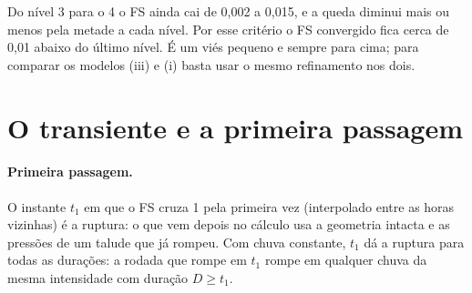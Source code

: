 \documentclass[11pt,a4paper]{article}
\begin{document}
Do nível 3 para o 4 o FS ainda cai de 0,002 a 0,015, e a queda diminui mais ou menos pela metade a cada nível. Por esse
critério o FS convergido fica cerca de 0,01 abaixo do último nível. É um viés pequeno e sempre para cima; para comparar
os modelos (iii) e (i) basta usar o mesmo refinamento nos dois.

\section{O transiente e a primeira passagem}\label{sec:trans}
\begin{table}[H]\centering\small
\caption{O transiente: o FS em 0, 24 e 48~h; a fração da chuva até 24~h que infiltrou (a chuva por metro inclinado,
74,1~m de superfície); a hora em que a superfície começa a alagar (face de percolação); o nível d'água em 24~h na
crista ($x = 30$~m, superfície em 30~m), no meio da face (25~m) e no pé (20~m).}\label{tab:diag}
\resizebox{\textwidth}{!}{}
\end{table}

\paragraph{Primeira passagem.} O instante $t_1$ em que o FS cruza 1 pela primeira vez (interpolado entre as horas
vizinhas) é a ruptura: o que vem depois no cálculo usa a geometria intacta e as pressões de um talude que já rompeu. Com
chuva constante, $t_1$ dá a ruptura para todas as durações: a rodada que rompe em $t_1$ rompe em qualquer chuva da
mesma intensidade com duração $D \ge t_1$.

\begin{table}[H]\centering\small
\caption{As rodadas que rompem: $t_1$ (o FS cruza 1 descendo), o instante em que volta acima de 1 e o tempo abaixo de
1.}\label{tab:cruza}

\end{table}
\end{document}
